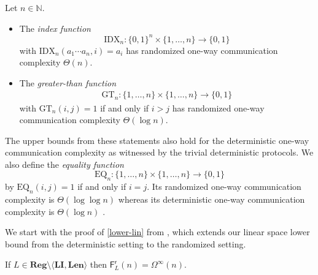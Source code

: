 \documentclass{theoretics}
\newcommand{\N}{\mathbb{N}}
\newcommand{\F}{\mathsf{F}}
\renewcommand{\r}{\mathsf{r}}
\newcommand{\Reg}{\mathbf{Reg}}
\newcommand{\Len}{\mathbf{Len}}
\newcommand{\LI}{\mathbf{LI}}
\newcommand{\Omegainf}{\Omega^{\scriptscriptstyle{\infty}}}
\begin{document}
\begin{theorem} \label{thm:coco}
Let $n \in \N$.
\begin{itemize}
\item The {\em index function}
\[ 
	\mathrm{IDX}_n \colon \{0,1\}^n\times \{1,\dots,n\} \to \{0,1\} 
\]
with $\mathrm{IDX}_n(a_1 \cdots a_n,i) = a_i$
has randomized one-way communication complexity $\Theta(n)$.
\item The {\em greater-than function}
\begin{align*}
	\mathrm{GT}_n \colon \{1,\dots,n\}\times \{1,\dots,n\} \to \{0,1\}
\end{align*}
with $\mathrm{GT}_n(i,j) = 1$ if and only if $i > j$
has randomized one-way communication complexity $\Theta(\log n)$.
\end{itemize}
\end{theorem}
The upper bounds from these statements also hold for the deterministic one-way communication complexity
as witnessed by the trivial deterministic protocols.
We also define the {\em equality function} 
\[ 
\mathrm{EQ}_n \colon \{1, \dots, n\} \times \{1,\dots,n\} \to \{0,1\}
\]
by $\mathrm{EQ}_n(i,j) = 1$ if and only if $i = j$.
Its randomized one-way communication complexity is $\Theta(\log \log n)$
whereas its deterministic one-way communication complexity is $\Theta(\log n)$ \cite{KushilevitzN97}.

We start with the proof of \ref{lower-lin} from , which extends our linear
space lower bound from the deterministic setting to the randomized setting.

\begin{proposition}
\label{thm:rand-lin}
If $L \in \Reg \setminus \langle \LI, \Len \rangle$
then $\F^\r_L(n) = \Omegainf(n)$.
\end{proposition}
\end{document}
